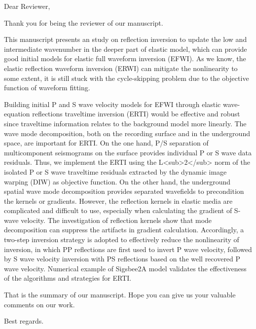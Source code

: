 Dear Reviewer,

Thank you for being the reviewer of our manuscript. 

This manuscript presents an study on reflection inversion to update the low and
intermediate wavenumber in the deeper part of elastic model, which can provide good
initial models for elastic full waveform inversion (EFWI). 
As we know, the elastic reflection waveform inversion (ERWI)
can mitigate the nonlinearity to some extent, it is
still stuck with the cycle-skipping problem due to the objective function of waveform
fitting. 

Building initial P and S wave velocity models for EFWI through elastic
wave-equation reflections traveltime inversion (ERTI) would be effective and robust
since traveltime information relates to the background model more linearly. The wave
mode decomposition, both on the recording surface and in the underground space, are
important for ERTI. On the one hand, P/S separation of multicomponent seismograms on
the surface provides individual P or S wave data residuals. Thus, we implement the
ERTI using the L<sub>2</sub> norm of the isolated P or S wave traveltime residuals
extracted by the dynamic image warping (DIW) as objective function. On the other hand,
the underground spatial wave mode decomposition provides separated wavefields to
precondition the kernels or gradients. However, the reflection kernels in elastic
media are complicated and difficult to use, especially when calculating the gradient
of S-wave velocity. The investigation of reflection kernels show that mode
decomposition can suppress the artifacts in gradient calculation. Accordingly, a
two-step inversion strategy is adopted to effectively reduce the nonlinearity of
inversion, in which PP reflections are first used  to invert P wave velocity,
followed by S wave velocity inversion with PS reflections based on the well recovered
P wave velocity. Numerical example of Sigsbee2A model validates the effectiveness of
the algorithms and strategies for ERTI.

That is the summary of our manuscript. Hope you can give us your valuable comments on
our work. 

Best regards.

